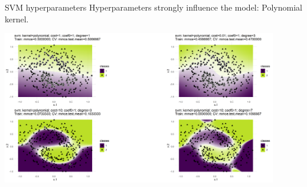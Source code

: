 \documentclass[11pt,compress,t,notes=noshow, xcolor=table]{beamer}
\begin{document}
\begin{vbframe}{SVM hyperparameters}
Hyperparameters strongly influence the model: Polynomial kernel.

\begin{center}
\includegraphics[width=0.9\textwidth]{figure/svm_poly_hyperparams.png}
\end{center}

\end{vbframe}
\end{document}
